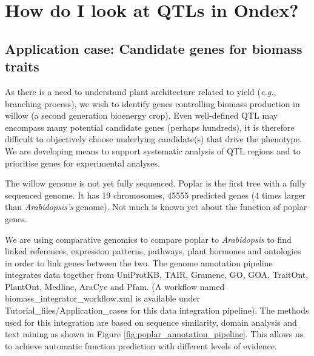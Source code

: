 
\chapter{How do I look at QTLs in Ondex?}
\label{cha:qtl}

\section*{Application case: Candidate genes for biomass traits}
\label{sec:k1}

As there is a need to understand plant architecture related to yield ({\it{e.g.}}, branching process),
we wish to identify genes controlling biomass production in willow (a second generation bioenergy crop). 
Even well-defined QTL may encompass many potential candidate genes (perhaps hundreds),
it is therefore difficult to objectively choose underlying candidate(s) that drive the phenotype.
We are developing means to support systematic analysis of QTL regions and to prioritise genes for experimental analyses.

The willow genome is not yet fully sequenced.
Poplar is the first tree with a fully sequenced genome.
It has 19 chromosomes, 45555 predicted genes (4 times larger than \textit{Arabidopsis's} genome).
Not much is known yet about the function of poplar genes.

We are using comparative genomics to compare poplar to \textit{Arabidopsis} to find linked references, expression patterns, pathways, plant hormones and ontologies
in order to link genes between the two.
The genome annotation pipeline integrates data together from UniProtKB, TAIR, Gramene, GO, GOA, TraitOnt, PlantOnt, Medline, AraCyc and Pfam.
(A workflow named biomass\_integrator\_workflow.xml is available under Tutorial\_files/Application\_cases for this data integration pipeline).
The methods used for this integration are based on sequence similarity, domain analysis and text mining as shown in Figure \ref{fig:poplar_annotation_pipeline}.
This allows us to achieve automatic function prediction with different levels of evidence.

